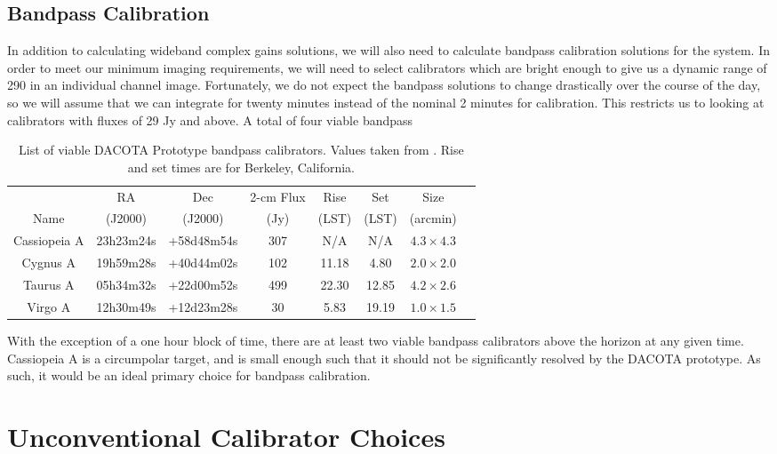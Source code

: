 \documentclass[preprint]{aastex}
\begin{document}
\subsection{Bandpass Calibration}\label{ssecbandpass}
In addition to calculating wideband complex gains solutions, we will also need to calculate bandpass calibration solutions for the system. In order to meet our minimum imaging requirements, we will need to select calibrators which are bright enough to give us a dynamic range of 290 in an individual channel image. Fortunately, we do not expect the bandpass solutions to change drastically over the course of the day, so we will assume that we can integrate for twenty minutes instead of the nominal 2 minutes for calibration. This restricts us to looking at calibrators with fluxes of 29 Jy and above. A total of four viable bandpass 
\begin{table}[!h]
\begin{center}
\begin{tabular}{|c||c|c|c|c|c|c|c} \hline
 & RA & Dec & 2-cm Flux & Rise & Set & Size \\
Name & (J2000) & (J2000) & (Jy) & (LST) & (LST) & (arcmin) \\
\hline
\hline
Cassiopeia A & 23h23m24s & +58d48m54s & 307 & N/A & N/A & $4.3\times4.3$ \\
Cygnus A & 19h59m28s & +40d44m02s & 102 & 11.18 & 4.80 & $2.0\times2.0$ \\
Taurus A & 05h34m32s & +22d00m52s & 499 & 22.30 & 12.85 & $4.2\times2.6$ \\
Virgo A & 12h30m49s & +12d23m28s & 30 & 5.83 & 19.19 & $1.0\times1.5$ \\
\hline
\end{tabular}
\caption{List of viable DACOTA Prototype bandpass calibrators. Values taken from \cite{Baars65}. Rise and set times are for Berkeley, California.
\label{tablebandpass}} 
\end{center}
\end{table}
With the exception of a one hour block of time, there are at least two viable bandpass calibrators above the horizon at any given time. Cassiopeia A is a circumpolar target, and is small enough such that it should not be significantly resolved by the DACOTA prototype. As such, it would be an ideal primary choice for bandpass calibration.
\section{Unconventional Calibrator Choices}\label{secsats}
\end{document}
